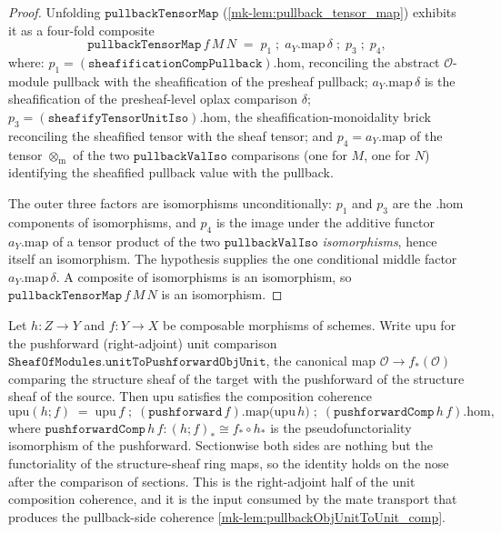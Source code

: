 \begin{proof}
  \leanok
  Unfolding \(\mathtt{pullbackTensorMap}\) (\ref{mk-lem:pullback_tensor_map}) exhibits it as a
  four-fold composite
  \[
    \mathtt{pullbackTensorMap}\,f\,M\,N
      \;=\;
    p_1 \;\mathbin{;}\; a_Y.\mathrm{map}\,\delta \;\mathbin{;}\; p_3 \;\mathbin{;}\; p_4,
  \]
  where:
  \(p_1 = (\mathtt{sheafificationCompPullback}).\mathrm{hom}\), reconciling the abstract
  \(\mathcal{O}\)-module pullback with the sheafification of the presheaf pullback;
  \(a_Y.\mathrm{map}\,\delta\) is the sheafification of the presheaf-level oplax comparison
  \(\delta\); \(p_3 = (\mathtt{sheafifyTensorUnitIso}).\mathrm{hom}\), the
  sheafification-monoidality brick reconciling the sheafified tensor with the sheaf tensor;
  and \(p_4 = a_Y.\mathrm{map}\) of the tensor \(\otimes_{\mathrm{m}}\) of the two
  \(\mathtt{pullbackValIso}\) comparisons (one for \(M\), one for \(N\)) identifying the
  sheafified pullback value with the pullback.

  The outer three factors are isomorphisms unconditionally: \(p_1\) and \(p_3\) are the
  \(.\mathrm{hom}\) components of isomorphisms, and \(p_4\) is the image under the additive
  functor \(a_Y.\mathrm{map}\) of a tensor product of the two \(\mathtt{pullbackValIso}\)
  \emph{isomorphisms}, hence itself an isomorphism. The hypothesis supplies the one
  conditional middle factor \(a_Y.\mathrm{map}\,\delta\). A composite of isomorphisms is an
  isomorphism, so \(\mathtt{pullbackTensorMap}\,f\,M\,N\) is an isomorphism.
\end{proof}

\begin{lemma}\label{mk-lem:unitToPushforwardObjUnit_comp}
  \leanok

  Let \(h : Z \to Y\) and \(f : Y \to X\) be composable morphisms of schemes. Write
  \(\mathrm{upu}\) for the pushforward (right-adjoint) unit comparison
  \(\mathtt{SheafOfModules.unitToPushforwardObjUnit}\), the canonical map
  \(\mathcal{O} \to f_*(\mathcal{O})\) comparing the structure sheaf of the target with
  the pushforward of the structure sheaf of the source. Then \(\mathrm{upu}\) satisfies
  the composition coherence
  \[
    \mathrm{upu}(h \mathbin{;} f)
      \;=\;
    \mathrm{upu}\,f \;\mathbin{;}\;
      (\mathtt{pushforward}\,f).\mathrm{map}\bigl(\mathrm{upu}\,h\bigr) \;\mathbin{;}\;
      (\mathtt{pushforwardComp}\,h\,f).\mathrm{hom},
  \]
  where \(\mathtt{pushforwardComp}\,h\,f : (h \mathbin{;} f)_* \cong f_* \circ h_*\) is the
  pseudofunctoriality isomorphism of the pushforward. Sectionwise both sides are nothing
  but the functoriality of the structure-sheaf ring maps, so the identity holds on the
  nose after the comparison of sections. This is the right-adjoint half of the unit
  composition coherence, and it is the input consumed by the mate transport that produces
  the pullback-side coherence \ref{mk-lem:pullbackObjUnitToUnit_comp}.
\end{lemma}

